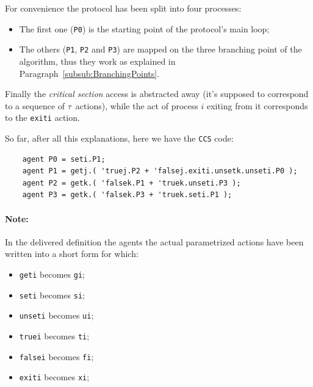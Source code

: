 \documentclass[10pt,a4paper]{article}
\newcommand{\Note}[1]{\paragraph{Note:}{#1}}
\newcommand{\CCS}{{\tt CCS}}
\newcommand{\CCSCode}[1]{{\tt #1}}
\newcommand{\Agent}[1]{{\tt {#1}}}
\begin{document}
            For convenience the protocol has been split into four
            processes:
            \begin{itemize}
            \item   The first one (\Agent{P0}) is the starting point of
                    the protocol's main loop;
            \item   The others (\Agent{P1}, \Agent{P2} and \Agent{P3}) are
                    mapped on the three branching point of the algorithm,
                    thus they work as explained in
                    Paragraph~\ref{subsub:BranchingPoints}.
            \end{itemize}

            Finally the \emph{critical section} access is abstracted away
            (it's supposed to correspond to a sequence of $\tau$~actions),
            while the act of process $i$ exiting from it corresponds to
            the \CCSCode{exiti} action.

            So far, after all this explanations, here we have the \CCS{}
            code:
            \begin{verbatim}
    agent P0 = seti.P1;
    agent P1 = getj.( 'truej.P2 + 'falsej.exiti.unsetk.unseti.P0 );
    agent P2 = getk.( 'falsek.P1 + 'truek.unseti.P3 );
    agent P3 = getk.( 'falsek.P3 + 'truek.seti.P1 );
            \end{verbatim}

            \Note{
                In the delivered definition the agents the actual
                parametrized actions have been written into a short form
                for which:
                \begin{multicols}{2}
                    \begin{itemize}
                    \item   \CCSCode{geti} becomes \CCSCode{gi};
                    \item   \CCSCode{seti} becomes \CCSCode{si};
                    \item   \CCSCode{unseti} becomes \CCSCode{ui};
                    \item   \CCSCode{truei} becomes \CCSCode{ti};
                    \item   \CCSCode{falsei} becomes \CCSCode{fi};
                    \item   \CCSCode{exiti} becomes \CCSCode{xi};
                    \end{itemize}
                \end{multicols}
            }
\end{document}
